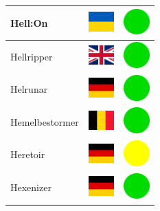 \documentclass[12pt, a4paper, twoside]{report}
\begin{document}
\begin{center}
\begin{longtable}{|p{5cm}|p{2cm}|p{2cm}|}
Hell:On & \includegraphics[width=1cm]{4x3/ua} & \includegraphics[width=1cm]{likes/y} \\ \hline
Hellripper & \includegraphics[width=1cm]{4x3/gb} & \includegraphics[width=1cm]{likes/y} \\ \hline
Helrunar & \includegraphics[width=1cm]{4x3/de} & \includegraphics[width=1cm]{likes/y} \\ \hline
Hemelbestormer & \includegraphics[width=1cm]{4x3/be} & \includegraphics[width=1cm]{likes/y} \\ \hline
Heretoir & \includegraphics[width=1cm]{4x3/de} & \includegraphics[width=1cm]{likes/m} \\ \hline
Hexenizer & \includegraphics[width=1cm]{4x3/de} & \includegraphics[width=1cm]{likes/y} \\ \hline

\end{longtable}
\end{center}
\end{document}

